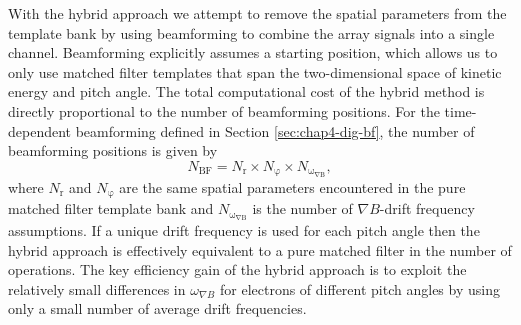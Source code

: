 With the hybrid approach we attempt to remove the spatial parameters from the template bank by using beamforming to combine the array signals into a single channel. Beamforming explicitly assumes a starting position, which allows us to only use matched filter templates that span the two-dimensional space of kinetic energy and pitch angle. The total computational cost of the hybrid method is directly proportional to the number of beamforming positions. For the time-dependent beamforming defined in Section \ref{sec:chap4-dig-bf}, the number of beamforming positions is given by 
\begin{equation}
    N_\mathrm{BF}=N_\mathrm{r}\times N_\mathrm{\varphi}\times N_\mathrm{\omega_{\nabla B}},
\end{equation}
where $N_\mathrm{r}$ and $N_\mathrm{\varphi}$ are the same spatial parameters encountered in the pure matched filter template bank and $N_\mathrm{\omega_{\nabla B}}$ is the number of $\nabla B$-drift frequency assumptions. If a unique drift frequency is used for each pitch angle then the hybrid approach is effectively equivalent to a pure matched filter in the number of operations. The key efficiency gain of the hybrid approach is to exploit the relatively small differences in $\omega_{\nabla B}$ for electrons of different pitch angles by using only a small number of average drift frequencies. 

